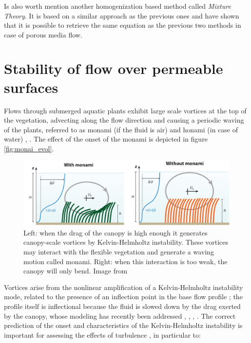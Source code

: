Is also worth mention another homogenization based method called \textit{Mixture Theory}.
It is based on a similar approach as the previous ones and  \citet{rajagopal2007hierarchy} have shown that it is possible to retrieve the same equation as the previous two methods in case of porous media flow.


\section{Stability of flow over permeable surfaces}
\label{sec:stability}

Flows through submerged aquatic plants exhibit large scale vortices at the top of the vegetation,
advecting along the flow direction and causing a periodic waving of the plants, referred to as
monami (if the fluid is air) and honami (in case of water) \citet{inoue1955studies}, \citet{ackerman1993reduced}.
The effect of the onset of the monami is depicted in figure \ref{fig:monai_evol}.

\begin{figure}[h]
	\centering
	\includegraphics[width=1\linewidth]{chapter_1/monami}
	\caption{Left: when the drag of the canopy is high enough it generates canopy-scale vortices by Kelvin-Helmholtz instability. These vortices may interact with the flexible vegetation and generate a waving motion called monami. Right: when this interaction is too weak, the canopy will only bend. Image from \citet{nepf2012flow}}
	\label{fig:monami}
\end{figure}

Vortices arise from the nonlinear amplification of a Kelvin-Helmholtz instability mode, related to the presence of an inflection point in the base flow profile \citet{asaeda2005morphological}; the profile itself is inflectional because the fluid is slowed down by the drag exerted by the canopy, whose modeling has recently been addressed \citet{py2004mixing}, \citet{singh2016linear},  \citet{zampogna2016instability}, \citet{tilton2008linear}.
The correct prediction of the onset and characteristics of the Kelvin-Helmholtz instability is important for assessing the effects of turbulence \citet{finnigan2000turbulence}, \citet{jimenez2001turbulent} in particular to:

